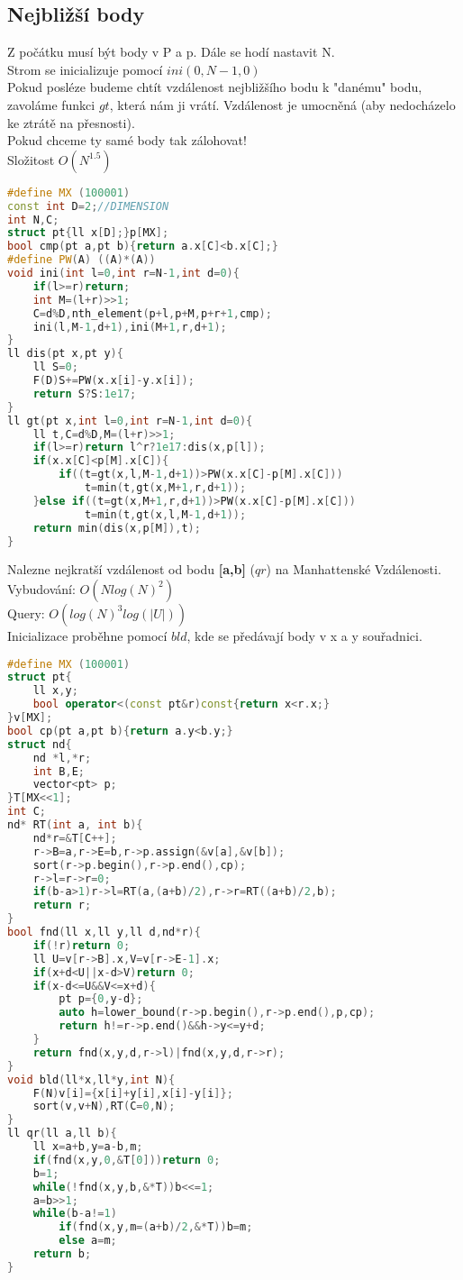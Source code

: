 \documentclass[11pt]{article}
\begin{document}
\subsection{Nejbližší body}
Z počátku musí být body v \textsf{P} a \textsf{p}. Dále se hodí nastavit \textsf{N}.
\\Strom se inicializuje pomocí $ini(0,N-1,0)$
\\Pokud posléze budeme chtít vzdálenost nejbližšího bodu k "danému" bodu, zavoláme funkci $gt$, která nám ji vrátí. Vzdálenost je umocněná (aby nedocházelo ke ztrátě na přesnosti).
\\Pokud chceme ty samé body tak zálohovat!
\\Složitost $O(N^{1.5})$
\begin{lstlisting}[language=C++]
#define MX (100001)
const int D=2;//DIMENSION
int N,C;
struct pt{ll x[D];}p[MX];
bool cmp(pt a,pt b){return a.x[C]<b.x[C];}
#define PW(A) ((A)*(A))
void ini(int l=0,int r=N-1,int d=0){
    if(l>=r)return;
    int M=(l+r)>>1;
    C=d%D,nth_element(p+l,p+M,p+r+1,cmp);
    ini(l,M-1,d+1),ini(M+1,r,d+1);
}
ll dis(pt x,pt y){
    ll S=0;
    F(D)S+=PW(x.x[i]-y.x[i]);
    return S?S:1e17;
}
ll gt(pt x,int l=0,int r=N-1,int d=0){
    ll t,C=d%D,M=(l+r)>>1;
    if(l>=r)return l^r?1e17:dis(x,p[l]);
    if(x.x[C]<p[M].x[C]){
        if((t=gt(x,l,M-1,d+1))>PW(x.x[C]-p[M].x[C]))
            t=min(t,gt(x,M+1,r,d+1));
    }else if((t=gt(x,M+1,r,d+1))>PW(x.x[C]-p[M].x[C]))
            t=min(t,gt(x,l,M-1,d+1));
    return min(dis(x,p[M]),t);
}
\end{lstlisting}
Nalezne nejkratší vzdálenost od bodu \textbf{[a,b]} ($qr$) na Manhattenské Vzdálenosti.
\\Vybudování: $O(Nlog(N)^2)$
\\Query: $O(log(N)^3log(|U|))$
\\Inicializace proběhne pomocí $bld$, kde se předávají body v \textsf{x} a \textsf{y} souřadnici.
\begin{lstlisting}[language=C++]
#define MX (100001)
struct pt{
    ll x,y;
    bool operator<(const pt&r)const{return x<r.x;}
}v[MX];
bool cp(pt a,pt b){return a.y<b.y;}
struct nd{
    nd *l,*r;
    int B,E;
    vector<pt> p;
}T[MX<<1];
int C;
nd* RT(int a, int b){
    nd*r=&T[C++];
    r->B=a,r->E=b,r->p.assign(&v[a],&v[b]);
    sort(r->p.begin(),r->p.end(),cp);
    r->l=r->r=0;
    if(b-a>1)r->l=RT(a,(a+b)/2),r->r=RT((a+b)/2,b);
    return r;
}
bool fnd(ll x,ll y,ll d,nd*r){
    if(!r)return 0;
    ll U=v[r->B].x,V=v[r->E-1].x;
    if(x+d<U||x-d>V)return 0;
    if(x-d<=U&&V<=x+d){
        pt p={0,y-d};
        auto h=lower_bound(r->p.begin(),r->p.end(),p,cp);
        return h!=r->p.end()&&h->y<=y+d;
    }
    return fnd(x,y,d,r->l)|fnd(x,y,d,r->r);
}
void bld(ll*x,ll*y,int N){
    F(N)v[i]={x[i]+y[i],x[i]-y[i]};
    sort(v,v+N),RT(C=0,N);
}
ll qr(ll a,ll b){
    ll x=a+b,y=a-b,m;
    if(fnd(x,y,0,&T[0]))return 0;
    b=1;
    while(!fnd(x,y,b,&*T))b<<=1;
    a=b>>1;
    while(b-a!=1)
        if(fnd(x,y,m=(a+b)/2,&*T))b=m;
        else a=m;
    return b;
}
\end{lstlisting}
\end{document}
